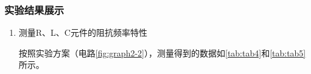 \documentclass[dvipsnames, svgnames,a4paper,11pt]{article}
\begin{document}
	\subsubsection{实验结果展示}
	\begin{enumerate}
		\item 测量R、L、C元件的阻抗频率特性
		
		按照实验方案（电路\cref{fig:graph2-2}），测量得到的数据如\cref{tab:tab4}和\cref{tab:tab5}所示。

				
			

\end{enumerate}
\end{document}
